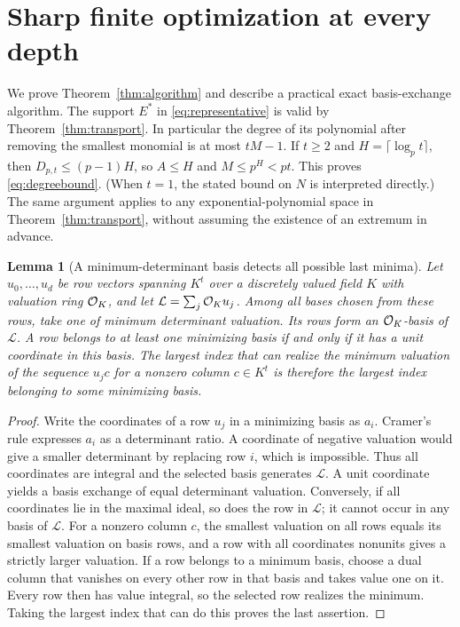 \documentclass[11pt]{article}
\newtheorem{lemma}[theorem]{Lemma}
\theoremstyle{remark}\newtheorem{remark}[theorem]{Remark}
\begin{document}
\section{Sharp finite optimization at every depth}

We prove Theorem~\ref{thm:algorithm} and describe a practical exact basis-exchange
algorithm. The support $E^*$ in \eqref{eq:representative} is valid by
Theorem~\ref{thm:transport}. In particular the degree of its polynomial after
removing the smallest monomial is at most $tM-1$. If $t\ge2$ and
$H=\lceil\log_p t\rceil$, then $D_{p,t}\le(p-1)H$, so $A\le H$ and
$M\le p^H<pt$. This proves \eqref{eq:degreebound}. (When $t=1$, the stated bound on
$N$ is interpreted directly.) The same argument applies to any exponential-polynomial
space in Theorem~\ref{thm:transport}, without assuming the existence of an extremum
in advance.

\begin{lemma}[A minimum-determinant basis detects all possible last minima]\label{lem:lattice}
Let $u_0,\ldots,u_d$ be row vectors spanning $K^t$ over a discretely valued field $K$
with valuation ring $\mathcal O_K$, and let $\mathcal L=\sum_j\mathcal O_K u_j$. Among all bases
chosen from these rows, take one of minimum determinant valuation. Its rows form an
$\mathcal O_K$-basis of $\mathcal L$. A row belongs to at least one minimizing basis if and
only if it has a unit coordinate in this basis. The largest index that can realize
the minimum valuation of the sequence $u_j c$ for a nonzero column $c\in K^t$ is
therefore the largest index belonging to some minimizing basis.
\end{lemma}
\begin{proof}
Write the coordinates of a row $u_j$ in a minimizing basis as $a_i$.
Cramer's rule expresses $a_i$ as a determinant ratio. A coordinate of negative
valuation would give a smaller determinant by replacing row $i$, which is impossible.
Thus all coordinates are integral and the selected basis generates $\mathcal L$.
A unit coordinate yields a basis exchange of equal determinant valuation.
Conversely, if all coordinates lie in the maximal ideal, so does the row in
$\mathcal L$; it cannot occur in any basis of $\mathcal L$.
For a nonzero column $c$, the smallest valuation on all rows equals its smallest
valuation on basis rows, and a row with all coordinates nonunits gives a strictly
larger valuation. If a row belongs to a minimum basis, choose a dual column that
vanishes on every other row in that basis and takes value one on it. Every row then
has value integral, so the selected row realizes the minimum. Taking the largest
index that can do this proves the last assertion.
\end{proof}
\end{document}
